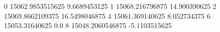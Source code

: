 0 15062.9853515625 9.6689453125
1 15068.216796875 14.900390625
2 15069.8662109375 16.5498046875
4 15061.369140625 8.052734375
6 15053.31640625 0.0
8 15048.2060546875 -5.1103515625

